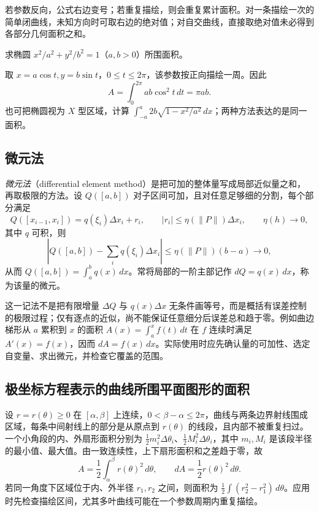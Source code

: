 \documentclass[UTF8,12pt,a4paper,fontset=fandol]{ctexbook}
\begin{document}
若参数反向，公式右边变号；若重复描绘，则会重复累计面积。对一条描绘一次的简单闭曲线，未知方向时可取右边的绝对值；对自交曲线，直接取绝对值未必得到各部分几何面积之和。

\begin{example}
\label{ex:ellipse-area-by-parameter}
求椭圆 $x^2/a^2+y^2/b^2=1$（$a,b>0$）所围面积。
\end{example}
\begin{solve}
取 $x=a\cos t,y=b\sin t$，$0\leq t\leq2\pi$，该参数按正向描绘一周。因此
\[
    A=\int_0^{2\pi}ab\cos^2t\,dt=\pi ab.
\]
也可把椭圆视为 $X$ 型区域，计算 $\int_{-a}^a2b\sqrt{1-x^2/a^2}\,dx$；两种方法表达的是同一面积。
\end{solve}

\subsection{微元法}
\label{subsec:differential-element-method}

\emph{微元法}（differential element method）是把可加的整体量写成局部近似量之和，再取极限的方法。设 $Q([a,b])$ 对子区间可加，且对任意足够细的分割，每个部分满足
\[
    Q([x_{i-1},x_i])=q(\xi_i)\Delta x_i+r_i,\qquad
    |r_i|\leq\eta(\|P\|)\Delta x_i,\qquad \eta(h)\to0,
\]
其中 $q$ 可积，则
\[
    \left|Q([a,b])-\sum_iq(\xi_i)\Delta x_i\right|
    \leq\eta(\|P\|)(b-a)\longrightarrow0,
\]
从而 $Q([a,b])=\int_a^bq(x)\,dx$。常将局部的一阶主部记作 $dQ=q(x)\,dx$，称为该量的微元。

这一记法不是把有限增量 $\Delta Q$ 与 $q(x)\Delta x$ 无条件画等号，而是概括有误差控制的极限过程；仅有逐点的近似，尚不能保证任意细分后误差总和趋于零。例如曲边梯形从 $a$ 累积到 $x$ 的面积 $A(x)=\int_a^xf(t)\,dt$ 在 $f$ 连续时满足 $A'(x)=f(x)$，因而 $dA=f(x)\,dx$。实际使用时应先确认量的可加性、选定自变量、求出微元，并检查它覆盖的范围。

\subsection{极坐标方程表示的曲线所围平面图形的面积}
\label{subsec:plane-areas-enclosed-by-polar-curves}

设 $r=r(\theta)\geq0$ 在 $[\alpha,\beta]$ 上连续，$0<\beta-\alpha\leq2\pi$，曲线与两条边界射线围成区域，每条中间射线上的部分是从原点到 $r(\theta)$ 的线段，且内部不被重复扫过。一个小角段的内、外扇形面积分别为 $\frac12m_i^2\Delta\theta_i$、$\frac12M_i^2\Delta\theta_i$，其中 $m_i,M_i$ 是该段半径的最小值、最大值。由一致连续性，上下扇形面积和之差趋于零，故
\begin{equation}
    A=\frac12\int_\alpha^\beta r(\theta)^2\,d\theta,
    \qquad dA=\frac12r(\theta)^2\,d\theta.
    \label{eq:polar-area}
\end{equation}
若同一角度下区域位于内、外半径 $r_1,r_2$ 之间，则面积为 $\frac12\int(r_2^2-r_1^2)\,d\theta$。应用时先检查描绘区间，尤其多叶曲线可能在一个参数周期内重复描绘。
\end{document}
